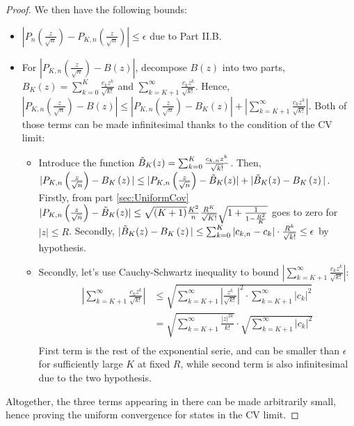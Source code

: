 \documentclass[aps,prl,showpacs,twocolumn]{revtex4-2}
\begin{document}
\begin{proof}
We then have the following bounds:
\begin{itemize}
    \item \(|P_n\left(\frac{z}{\sqrt{n}}\right)-P_{K,n}\left(\frac{z}{\sqrt{n}}\right)|\leq \epsilon\) due to Part II.B.
    \item For \(|P_{K,n}\left(\frac{z}{\sqrt{n}}\right)-B\left(z\right)|\), decompose \(B\left(z\right)\) into two parts, \(B_K\left(z\right) =   \sum_{k=0}^K \frac{c_kz^k}{\sqrt{k!}}\) and \( \sum_{k=K+1}^\infty \frac{c_kz^k}{\sqrt{k!}}\). Hence,  \(|P_{K,n}\left(\frac{z}{\sqrt{n}}\right)-B\left(z\right)|  \leq |P_{K,n}\left(\frac{z}{\sqrt{n}}\right)-B_K\left(z\right)| + | \sum_{k=K+1}^\infty \frac{c_kz^k}{\sqrt{k!}}| \). Both of those terms can be made infinitesimal thanks to the condition of the CV limit:
    \begin{itemize}
        \item Introduce the function \(\Tilde{B}_K(z) =\sum_{k=0}^K\frac{c_{k, n} z^k}{\sqrt{k!}} \).   Then, \(|P_{K,n}\left(\frac{z}{\sqrt{n}}\right)-B_K\left(z\right)| \leq |P_{K,n}\left(\frac{z}{\sqrt{n}}\right)-\Tilde{B}_K(z)| + |\Tilde{B}_K(z) -B_K\left(z\right)| \).
        Firstly, from  part \ref{sec:UniformCov}  \(|P_{K,n}\left(\frac{z}{\sqrt{n}}\right)-\Tilde{B}_K(z)| \leq \sqrt{ (K+1)} \frac{K^2}{n}\frac{R^{K}}{\sqrt{K!}}
   \sqrt{1 + \frac{1}{1-\frac{R^2}{K}}}\)  goes to zero for \(|z|\leq R\). Secondly,  \(|\Tilde{B}_K(z) -B_K\left(z\right)| \leq \sum_{k=0}^K |c_{k,n}-c_k|\cdot \frac{R^k}{\sqrt{k!}}\leq \epsilon \) by hypothesis.
        \item Secondly, let's use Cauchy-Schwartz inequality to bound \(\left| \sum_{k=K+1}^\infty \frac{c_kz^k}{\sqrt{k!}}\right|\):
		\begin{align*}
		     \left| \sum_{k=K+1}^\infty \frac{c_kz^k}{\sqrt{k!}}\right|&\leq \sqrt{ \sum_{k=K+1}^\infty  \left| \frac{z^k}{\sqrt{k!}} \right|^2  \cdot \sum_{k=K+1}^\infty \left|c_k\right|^2}\\
             &= \sqrt{\sum_{k=K+1}^\infty   \frac{\left|z\right|^{2k}}{k!} }   \cdot \sqrt{\sum_{k=K+1}^\infty \left|c_k\right|^2}\\
		\end{align*}
        First term is the rest of the exponential serie, and can be smaller than $\epsilon$ for sufficiently large $K$ at fixed $R$, while second term is also infinitesimal due to the two hypothesis.
	\end{itemize}
\end{itemize}

Altogether, the three terms appearing in there can be made arbitrarily small, hence proving the uniform convergence for states in the CV limit.
\end{proof}
\end{document}
